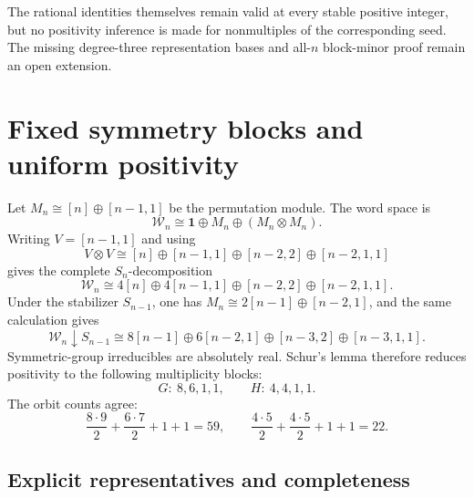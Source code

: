 \documentclass[11pt]{article}
\newcommand{\W}{\mathcal W}
\newcommand{\one}{\mathbf 1}
\begin{document}
The rational identities themselves remain valid at every stable positive
integer, but no positivity inference is made for nonmultiples of the
corresponding seed.  The missing degree-three representation bases and
all-\(n\) block-minor proof remain an open extension.

\section{Fixed symmetry blocks and uniform positivity}\label{sec:positivity}

Let \(M_n\cong[n]\oplus[n-1,1]\) be the permutation module.  The word space is
\[
 \W_n\cong\one\oplus M_n\oplus(M_n\otimes M_n).
\]
Writing \(V=[n-1,1]\) and using
\[
 V\otimes V
 \cong[n]\oplus[n-1,1]\oplus[n-2,2]\oplus[n-2,1,1]
\]
gives the complete \(S_n\)-decomposition
\begin{equation}\label{eq:H-decomposition}
 \W_n\cong
 4[n]\oplus4[n-1,1]\oplus[n-2,2]\oplus[n-2,1,1].
\end{equation}
Under the stabilizer \(S_{n-1}\), one has
\(M_n\cong2[n-1]\oplus[n-2,1]\), and the same calculation gives
\begin{equation}\label{eq:G-decomposition}
 \W_n\!\downarrow S_{n-1}
 \cong
 8[n-1]\oplus6[n-2,1]\oplus[n-3,2]\oplus[n-3,1,1].
\end{equation}
Symmetric-group irreducibles are absolutely real.  Schur's lemma therefore reduces positivity to the following multiplicity blocks:
\[
 G:\ 8,6,1,1,\qquad H:\ 4,4,1,1.
\]
The orbit counts agree:
\[
 \frac{8\cdot9}{2}+\frac{6\cdot7}{2}+1+1=59,
 \qquad
 \frac{4\cdot5}{2}+\frac{4\cdot5}{2}+1+1=22.
\]

\subsection{Explicit representatives and completeness}
\end{document}
